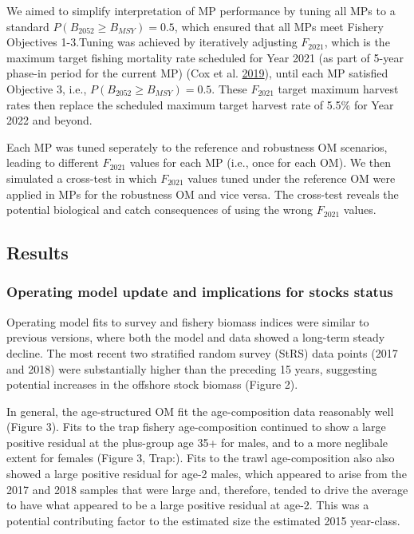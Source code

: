 \documentclass[11pt]{book}
\begin{document}
We aimed to simplify interpretation of MP performance by tuning all MPs to a standard \(P(B_{2052} \geq B_{MSY}) = 0.5\), which ensured that all MPs meet Fishery Objectives 1-3.Tuning was achieved by iteratively adjusting \(F_{2021}\), which is the maximum target fishing mortality rate scheduled for Year 2021 (as part of 5-year phase-in period for the current MP) (Cox et al. \protect\hyperlink{ref-cox2019evaluating}{2019}), until each MP satisfied Objective 3, i.e., \(P(B_{2052} \geq B_{MSY}) = 0.5\). These \(F_{2021}\) target maximum harvest rates then replace the scheduled maximum target harvest rate of 5.5\% for Year 2022 and beyond.

Each MP was tuned seperately to the reference and robustness OM scenarios, leading to different \(F_{2021}\) values for each MP (i.e., once for each OM). We then simulated a cross-test in which \(F_{2021}\) values tuned under the reference OM were applied in MPs for the robustness OM and vice versa. The cross-test reveals the potential biological and catch consequences of using the wrong \(F_{2021}\) values.

\hypertarget{results}{%
\subsection{Results}\label{results}}

\hypertarget{operating-model-update-and-implications-for-stocks-status}{%
\subsubsection{Operating model update and implications for stocks status}\label{operating-model-update-and-implications-for-stocks-status}}

Operating model fits to survey and fishery biomass indices were similar to previous versions, where both the model and data showed a long-term steady decline. The most recent two stratified random survey (StRS) data points (2017 and 2018) were substantially higher than the preceding 15 years, suggesting potential increases in the offshore stock biomass (Figure 2).

In general, the age-structured OM fit the age-composition data reasonably well (Figure 3). Fits to the trap fishery age-composition continued to show a large positive residual at the plus-group age 35+ for males, and to a more neglibale extent for females (Figure 3, Trap:). Fits to the trawl age-composition also also showed a large positive residual for age-2 males, which appeared to arise from the 2017 and 2018 samples that were large and, therefore, tended to drive the average to have what appeared to be a large positive residual at age-2. This was a potential contributing factor to the estimated size the estimated 2015 year-class.
\end{document}
